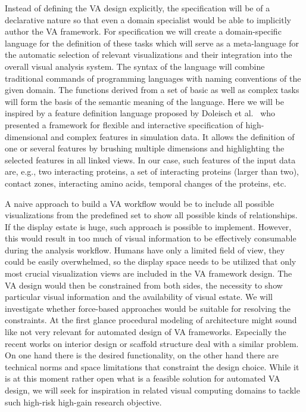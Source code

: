 \documentclass[11pt,a4paper,titlepage,oneside,onecolumn]{article}
\begin{document}
Instead of defining the VA design explicitly, the specification will be of a declarative nature so that even a domain specialist would be able to implicitly author the VA framework.
For specification we will create a domain-specific language for the definition of these tasks which will serve as a meta-language for the automatic selection of relevant visualizations and their integration into the overall visual analysis system. The syntax of the language will combine traditional commands of programming languages with naming conventions of the given domain. The functions derived from a set of basic as well as complex tasks will form the basis of the semantic meaning of the language. Here we will be inspired by a feature definition language proposed by Doleisch et al.~\cite{Doleisch} who presented a framework for flexible and interactive specification of high-dimensional and complex features in simulation data. It allows the definition of one or several features by brushing multiple dimensions and highlighting the selected features in all linked views.
In our case, such features of the input data are, e.g., two interacting proteins, a set of interacting proteins (larger than two), contact zones, interacting amino acids, temporal changes of the proteins, etc. 

A naive approach to build a VA workflow would be to include all possible visualizations from the predefined set to show all possible kinds of relationships. If the display estate is huge, such approach is possible to implement. However, this would result in too much of visual information to be effectively consumable during the analysis workflow. Humans have only a limited field of view, they could be easily overwhelmed, so the display space needs to be utilized that only most crucial visualization views are included in the VA framework design. The VA design would then be constrained from both sides, the necessity to show particular visual information and the availability of visual estate. We will investigate whether force-based approaches would be suitable for resolving the constraints. At the first glance procedural modeling of architecture might sound like not very relevant for automated design of VA frameworks. Especially the recent works on interior design or scaffold structure deal with a similar problem. On one hand there is the desired functionality, on the other hand there are technical norms and space limitations that constraint the design choice. While it is at this moment rather open what is a feasible solution for automated VA design, we will seek for inspiration in related visual computing domains to tackle such high-risk high-gain research objective.
\end{document}
